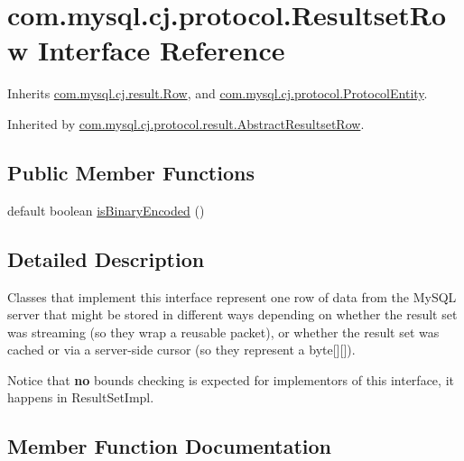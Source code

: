 \hypertarget{interfacecom_1_1mysql_1_1cj_1_1protocol_1_1_resultset_row}{}\section{com.\+mysql.\+cj.\+protocol.\+Resultset\+Row Interface Reference}
\label{interfacecom_1_1mysql_1_1cj_1_1protocol_1_1_resultset_row}


Inherits \mbox{\hyperlink{interfacecom_1_1mysql_1_1cj_1_1result_1_1_row}{com.\+mysql.\+cj.\+result.\+Row}}, and \mbox{\hyperlink{interfacecom_1_1mysql_1_1cj_1_1protocol_1_1_protocol_entity}{com.\+mysql.\+cj.\+protocol.\+Protocol\+Entity}}.



Inherited by \mbox{\hyperlink{classcom_1_1mysql_1_1cj_1_1protocol_1_1result_1_1_abstract_resultset_row}{com.\+mysql.\+cj.\+protocol.\+result.\+Abstract\+Resultset\+Row}}.

\subsection*{Public Member Functions}
\begin{DoxyCompactItemize}
\item 
default boolean \mbox{\hyperlink{interfacecom_1_1mysql_1_1cj_1_1protocol_1_1_resultset_row_a7460706550d3aea6a340ff6676bd7062}{is\+Binary\+Encoded}} ()
\end{DoxyCompactItemize}


\subsection{Detailed Description}
Classes that implement this interface represent one row of data from the My\+S\+QL server that might be stored in different ways depending on whether the result set was streaming (so they wrap a reusable packet), or whether the result set was cached or via a server-\/side cursor (so they represent a byte\mbox{[}\mbox{]}\mbox{[}\mbox{]}).

Notice that {\bfseries no} bounds checking is expected for implementors of this interface, it happens in Result\+Set\+Impl. 

\subsection{Member Function Documentation}
\mbox{\label{interfacecom_1_1mysql_1_1cj_1_1protocol_1_1_resultset_row_a7460706550d3aea6a340ff6676bd7062}} 
